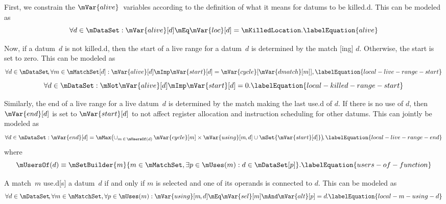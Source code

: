 First, we constrain the $\mVar{alive}$~\glspl{variable} according to the
definition of what it means for \glspl{datum} to be \gls{killed.d}.
%
This can be modeled as
%
\begin{equation}
  \forall d \in \mDataSet :
  \mVar{alive}[d]
  \mEq
  \mVar{loc}[d] = \mKilledLocation.
  \labelEquation{alive}
\end{equation}

Now, if a \gls{datum}~$d$ is not \gls{killed.d}, then the start of a \gls{live
  range} for a \gls{datum}~$d$ is determined by the \gls{match}
[ing] $d$\hspace{-.8pt}.
%
Otherwise, the start is set to zero.
%
This can be modeled as
%
\begin{equation}
  \forall d \in \mDataSet \!,
  \forall m \in \mMatchSet[d] :
  \mVar{alive}[d]
  \mImp
  \mVar{start}[d] = \mVar{cycle}[\mVar{dmatch}[m]],
  \labelEquation{local-live-range-start}
\end{equation}
%
\begin{equation}
  \forall d \in \mDataSet :
  \mNot\mVar{alive}[d]
  \mImp
  \mVar{start}[d] = 0.
  \labelEquation{local-killed-range-start}
\end{equation}

Similarly, the end of a \gls{live range} for a live \gls{datum}~$d$ is
determined by the \gls{match} making the last \gls{use.d} of $d$\hspace{-.8pt}.
%
If there is no use of $d$\hspace{-.8pt}, then $\mVar{end}[d]$ is set to
$\mVar{start}[d]$ to not affect \gls{register allocation} and \gls{instruction
  scheduling} for other \glspl{datum}.
%
This can jointly be modeled as
%
\begin{equation}
  \forall d \in \mDataSet :
  \mVar{end}[d] =
  \mMax\!
  \left(
    \cup_{m \,\in\, \mUsersOf(d)} \,
    \mVar{cycle}[m]
    \times
    \mVar{using}[m \hspace{-.8pt}, d]
    \cup
    \mSet{\mVar{start}[d]}
  \right)\!\!,
  \labelEquation{local-live-range-end}
\end{equation}
%
where
%
\begin{equation}
  \mUsersOf(d)
  \equiv
  \mSetBuilder{m}%
              {
                m \in \mMatchSet,
                \exists p \in \mUses(m) :
                d \in \mDataSet[p]
              }.
  \labelEquation{users-of-function}
\end{equation}

A \gls{match}~$m$ \gls{use.d}[s] a \gls{datum}~$d$ if and only if $m$ is
selected and one of its \glspl{operand} is connected to $d$\hspace{-.8pt}.
%
This can be modeled as
%
\begin{equation}
  \forall d \in \mDataSet \!,
  \forall m \in \mMatchSet,
  \forall p \in \mUses(m) :
  \mVar{using}[m \hspace{-.8pt}, d]
  \mEq
  \mVar{sel}[m] \mAnd \mVar{alt}[p] = d \hspace{-.8pt}.
  \labelEquation{local-m-using-d}
\end{equation}

